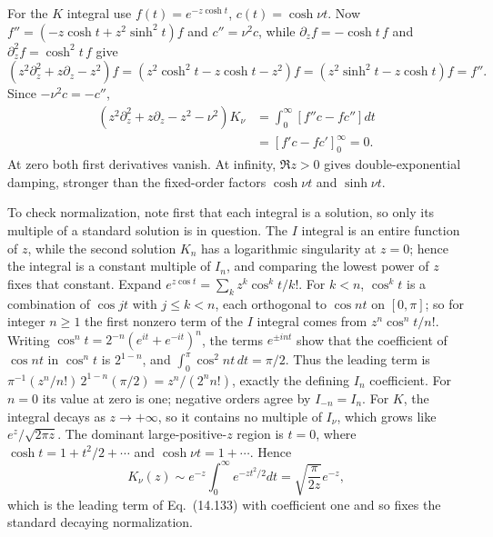 For the $K$ integral use $f(t)=e^{-z\cosh t}$,
$c(t)=\cosh\nu t$. Now
$f''=(-z\cosh t+z^2\sinh^2t)f$ and $c''=\nu^2c$, while
$\partial_zf=-\cosh t\,f$ and $\partial_z^2f=\cosh^2t\,f$ give
\[
(z^2\partial_z^2+z\partial_z-z^2)f
=(z^2\cosh^2t-z\cosh t-z^2)f=(z^2\sinh^2t-z\cosh t)f=f''.
\]
Since $-\nu^2c=-c''$,
\begin{align*}
(z^2\partial_z^2+z\partial_z-z^2-\nu^2)K_\nu
&=\int_0^\infty[f''c-fc'']dt\\
&=[f'c-fc']_0^\infty=0.
\end{align*}
At zero both first derivatives vanish. At infinity, $\Re z>0$
gives double-exponential damping, stronger than the fixed-order
factors $\cosh\nu t$ and $\sinh\nu t$.

To check normalization, note first that each integral is a
solution, so only its multiple of a standard solution is in
question. The $I$ integral is an entire function of $z$, while the
second solution $K_n$ has a logarithmic singularity at $z=0$;
hence the integral is a constant multiple of $I_n$, and comparing
the lowest power of $z$ fixes that constant. Expand
$e^{z\cos t}=\sum_kz^k\cos^kt/k!$. For $k<n$, $\cos^kt$ is a
combination of $\cos jt$ with $j\le k<n$, each orthogonal to
$\cos nt$ on $[0,\pi]$; so for integer $n\ge1$ the first nonzero
term of the $I$ integral comes from $z^n\cos^nt/n!$.
Writing $\cos^nt=2^{-n}(e^{it}+e^{-it})^n$, the terms $e^{\pm int}$
show that the coefficient of $\cos nt$ in $\cos^nt$ is $2^{1-n}$,
and $\int_0^\pi\cos^2nt\,dt=\pi/2$. Thus the leading term is
$\pi^{-1}(z^n/n!)\,2^{1-n}(\pi/2)=z^n/(2^nn!)$, exactly the
defining $I_n$ coefficient.
For $n=0$ its value at zero is one; negative orders agree by
$I_{-n}=I_n$. For $K$, the integral decays as $z\to+\infty$,
so it contains no multiple of $I_\nu$, which grows like
$e^z/\sqrt{2\pi z}$. The dominant large-positive-$z$ region
is $t=0$, where $\cosh t=1+t^2/2+\cdots$ and
$\cosh\nu t=1+\cdots$. Hence
\[
K_\nu(z)\sim e^{-z}\int_0^\infty e^{-zt^2/2}dt
=\sqrt{\frac\pi{2z}}e^{-z},
\]
which is the leading term of Eq.~(14.133) with coefficient one and
so fixes the standard decaying normalization.

